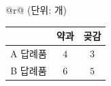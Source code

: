\begin{tabular}{@{}r@{}}
{\footnotesize (단위: 개)} \\[-1pt]
\begin{tabular}{|c|c|c|}
\hline
 & 약과 & 곶감 \\
\hline
A 답례품 & $4$ & $3$ \\
\hline
B 답례품 & $6$ & $5$ \\
\hline
\end{tabular}
\end{tabular}
